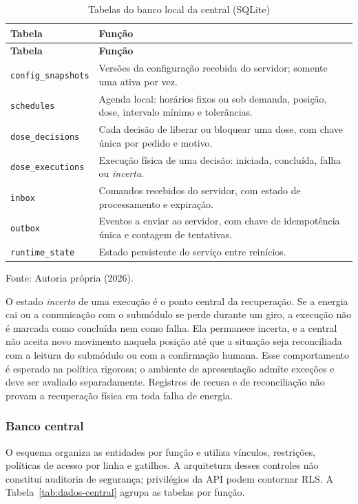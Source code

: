 {\small\setlength{\tabcolsep}{3pt}\begin{longtable}{p{}p{}}
\caption{Tabelas do banco local da central (SQLite)}\label{tab:dados-local}\\
\hline\textbf{Tabela} & \textbf{Função}\\\hline\endfirsthead
\hline\textbf{Tabela} & \textbf{Função}\\\hline\endhead
\texttt{config\_snapshots} & Versões da configuração recebida do servidor; somente uma ativa por vez.\\\hline
\texttt{schedules} & Agenda local: horários fixos ou sob demanda, posição, dose, intervalo mínimo e tolerâncias.\\\hline
\texttt{dose\_decisions} & Cada decisão de liberar ou bloquear uma dose, com chave única por pedido e motivo.\\\hline
\texttt{dose\_executions} & Execução física de uma decisão: iniciada, concluída, falha ou \emph{incerta}.\\\hline
\texttt{inbox} & Comandos recebidos do servidor, com estado de processamento e expiração.\\\hline
\texttt{outbox} & Eventos a enviar ao servidor, com chave de idempotência única e contagem de tentativas.\\\hline
\texttt{runtime\_state} & Estado persistente do serviço entre reinícios.\\\hline
\end{longtable}}{\small\noindent Fonte: Autoria própria (2026).\par}

O estado \emph{incerto} de uma execução é o ponto central da recuperação. Se a energia cai ou a comunicação com o submódulo se perde durante um giro, a execução não é marcada como concluída nem como falha. Ela permanece incerta, e a central não aceita novo movimento naquela posição até que a situação seja reconciliada com a leitura do submódulo ou com a confirmação humana. Esse comportamento é esperado na política rigorosa; o ambiente de apresentação admite exceções e deve ser avaliado separadamente. Registros de recusa e de reconciliação não provam a recuperação física em toda falha de energia.

\subsubsection{Banco central}
O esquema organiza as entidades por função e utiliza vínculos, restrições, políticas de acesso por linha e gatilhos. A arquitetura desses controles não constitui auditoria de segurança; privilégios da API podem contornar RLS. A Tabela~\ref{tab:dados-central} agrupa as tabelas por função.

